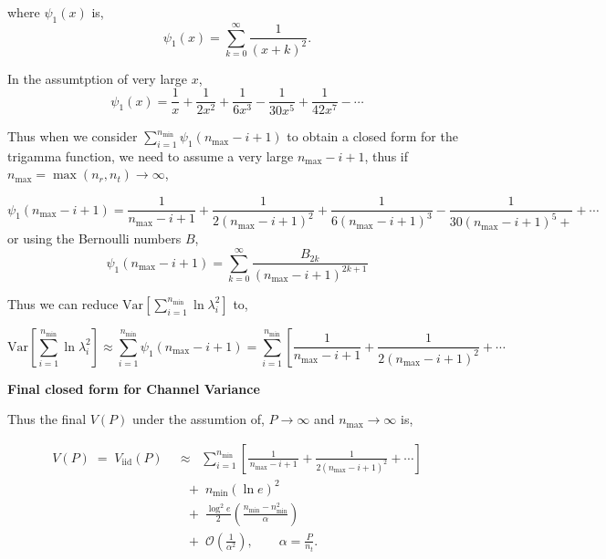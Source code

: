\documentclass[a4paper, 12pt, onecolumn, journal, twoside, draftclsnofoot]{IEEEtran}
\begin{document}
where $\psi_1(x)$ is, 
\begin{equation*}
\psi_1(x)=\sum_{k=0}^\infty\frac{1}{(x+k)^2}.
\end{equation*}

In the assumtption of very large $x$, 
\begin{equation*}
\psi_1(x)=\frac{1}{x}+\frac{1}{2x^2}+\frac{1}{6x^3}-\frac{1}{30x^5}+\frac{1}{42x^7}-\cdots
\end{equation*}

Thus when we consider $\sum_{i=1}^{n_{\min}} \psi_1(n_{\max}-i+1)$ to obtain a closed form for the trigamma function, we need to assume a very large $n_{\max}-i+1$, thus if $n_{\max} = \max(n_r,n_t) \to \infty$, 

\begin{equation*}
\psi_1(n_{\max}-i+1)=\frac{1}{n_{\max}-i+1}+\frac{1}{2(n_{\max}-i+1)^2}+\frac{1}{6(n_{\max}-i+1)^3} - \frac{1}{30(n_{\max}-i+1)^5 +} + \cdots
\end{equation*}
or using the Bernoulli numbers $B$,
\begin{equation*}
\psi_1(n_{\max}-i+1)=\sum_{k=0}^\infty\frac{B_{2k}}{(n_{\max}-i+1)^{2k+1}}
\end{equation*}

Thus we can reduce $\mathrm{Var}\!\left[\sum_{i=1}^{n_{\min}}\ln \lambda_i^2\right] $ to, 

\begin{equation*}
\mathrm{Var}\left[\sum_{i=1}^{n_{\min}}\ln\lambda_i^2\right]\approx\sum_{i=1}^{n_{\min}}\psi_1(n_{\max}-i+1)=\sum_{i=1}^{n_{\min}}\left[\frac{1}{n_{\max}-i+1}+\frac{1}{2(n_{\max}-i+1)^2}\right.+ \cdots
\end{equation*}

\newpage
\textbf{Final closed form for Channel Variance}

Thus the final $V(P)$ under the assumtion of, $P \to \infty$ and $n_{\max} \to \infty$ is, 

 \begin{equation*}
\begin{aligned}
V(P) \;=\; V_{\mathrm{iid}}(P) 
&\;\approx\; \; \sum_{i=1}^{n_{\min}}\!\left[
    \frac{1}{\,n_{\max}-i+1\,}
    + \frac{1}{2(n_{\max}-i+1)^2}
    + \cdots
\right] \\[0.6em]
&\quad +\; n_{\min}(\ln e)^2 \\[0.6em]
&\quad +\; \frac{\log^2 e}{2}\left(\frac{n_{\min}-n_{\min}^2}{\alpha}\right) \\[0.6em]
&\quad +\; \mathcal{O}\!\left(\tfrac{1}{\alpha^2}\right),
\qquad \alpha=\tfrac{P}{n_t}.
\end{aligned}
\end{equation*}
\end{document}
